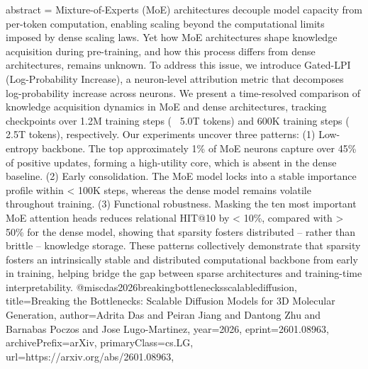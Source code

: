 {      abstract = {Mixture-of-Experts (MoE) architectures decouple model capacity from per-token computation, enabling scaling beyond the computational limits imposed by dense scaling laws. Yet how MoE architectures shape knowledge acquisition during pre-training, and how this process differs from dense architectures, remains unknown. To address this issue, we introduce Gated-LPI (Log-Probability Increase), a neuron-level attribution metric that decomposes log-probability increase across neurons. We present a time-resolved comparison of knowledge acquisition dynamics in MoE and dense architectures, tracking checkpoints over 1.2M training steps (~ 5.0T tokens) and 600K training steps (~ 2.5T tokens), respectively. Our experiments uncover three patterns: (1) Low-entropy backbone. The top approximately 1\% of MoE neurons capture over 45\% of positive updates, forming a high-utility core, which is absent in the dense baseline. (2) Early consolidation. The MoE model locks into a stable importance profile within < 100K steps, whereas the dense model remains volatile throughout training. (3) Functional robustness. Masking the ten most important MoE attention heads reduces relational HIT@10 by < 10\%, compared with > 50\% for the dense model, showing that sparsity fosters distributed -- rather than brittle -- knowledge storage. These patterns collectively demonstrate that sparsity fosters an intrinsically stable and distributed computational backbone from early in training, helping bridge the gap between sparse architectures and training-time interpretability.}
}@misc{das2026breakingbottlenecksscalablediffusion,
      title={Breaking the Bottlenecks: Scalable Diffusion Models for 3D Molecular Generation}, 
      author={Adrita Das and Peiran Jiang and Dantong Zhu and Barnabas Poczos and Jose Lugo-Martinez},
      year={2026},
      eprint={2601.08963},
      archivePrefix={arXiv},
      primaryClass={cs.LG},
      url={https://arxiv.org/abs/2601.08963},
}
